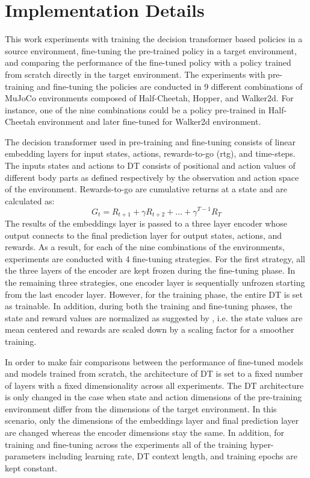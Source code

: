 \documentclass[10pt,a4paper]{article}
\begin{document}
\section{Implementation Details}
\label{section:3}
This work experiments with training the decision transformer based policies in a source 
environment, fine-tuning the pre-trained policy in a target environment, and comparing
the performance of the fine-tuned policy with a policy trained from scratch directly in
the target environment. The experiments with pre-training and fine-tuning the policies are 
conducted in 9 different combinations of MuJoCo \cite{mujoco} environments composed of 
Half-Cheetah, Hopper, and Walker2d. For instance, one of the nine combinations could be a 
policy pre-trained in Half-Cheetah environment and later fine-tuned for Walker2d environment.

The decision transformer used in pre-training and fine-tuning consists of linear embedding layers
for input states, actions, rewards-to-go (rtg), and time-steps. The inputs states and actions to 
DT consists of positional and action values of different body parts as defined respectively by the 
observation and action space of the environment. Rewards-to-go are cumulative returns at a state 
and are calculated as:
$$G_{t} = R_{t+1} + \gamma R_{t + 2} + \dots +  {\gamma}^{T-1} R_{T}$$
The results of the embeddings layer is passed to a three layer encoder whose output connects to the 
final prediction layer for output states, actions, and rewards. As a result, for each of the nine 
combinations of the environments, experiments are conducted with 4 fine-tuning strategies. For the 
first strategy, all the three layers of the encoder are kept frozen during the fine-tuning phase. 
In the remaining three strategies, one encoder layer is sequentially unfrozen starting from the last 
encoder layer. However, for the training phase, the entire DT is set as trainable. In addition, during
both the training and fine-tuning phases, the state and reward values are normalized as suggested by 
\cite{chen2021decision}, i.e. the state values are mean centered and rewards are scaled down by a scaling
factor for a smoother training.

In order to make fair comparisons between the performance of fine-tuned models and models trained from scratch,
the architecture of DT is set to a fixed number of layers with a fixed dimensionality across all experiments. 
The DT architecture is only changed in the case when state and action dimensions of the pre-training environment 
differ from the dimensions of the target environment. In this scenario, only the dimensions of the embeddings layer 
and final prediction layer are changed whereas the encoder dimensions stay the same. In addition, for training and 
fine-tuning across the experiments all of the training hyper-parameters including learning rate, DT context length, and 
training epochs are kept constant.
\end{document}
